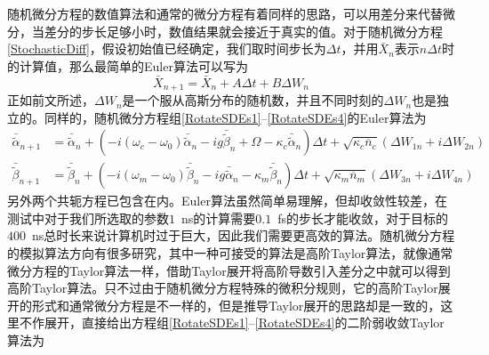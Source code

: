 随机微分方程的数值算法和通常的微分方程有着同样的思路，可以用差分来代替微分，当差分的步长足够小时，数值结果就会接近于真实的值。对于随机微分方程\eqref{StochasticDiff}，假设初始值已经确定，我们取时间步长为$\Delta t$，并用$\bar{X}_n$表示$n\Delta t$时的计算值，那么最简单的Euler算法可以写为
\begin{equation}
\bar{X}_{n+1}=\bar{X}_n + A \Delta t + B \Delta W_n
\end{equation}
正如前文所述，$\Delta W_n$是一个服从高斯分布的随机数，并且不同时刻的$\Delta W_n$也是独立的。同样的，随机微分方程组\eqref{RotateSDEs1}--\eqref{RotateSDEs4}的Euler算法为
\begin{equation}
\begin{aligned}
\bar{\tilde{\alpha}}_{n+1}&=\bar{\tilde{\alpha}}_{n}+(-i(\omega_{c}-\omega_{0})\bar{\tilde{\alpha}}_{n}-ig\bar{\tilde{\beta}}_{n}+\Omega -\kappa_{c}\bar{\tilde{\alpha}}_{n})\Delta t+\sqrt{\kappa_c\overline{n}_{c}}(\Delta{W}_{1n}+i\Delta{W}_{2n}) \\
\bar{\tilde{\beta}}_{n+1}&=\bar{\tilde{\beta}}_{n}+(-i(\omega_{m}-\omega_{0})\bar{\tilde{\beta}}_{n}-ig\bar{\tilde{\alpha}}_{n}-\kappa_{m}\bar{\tilde{\beta}}_{n})\Delta t+\sqrt{\kappa_m\overline{n}_{m}}(\Delta{W}_{3n}+i\Delta{W}_{4n})
\end{aligned}
\end{equation}
另外两个共轭方程已包含在内。Euler算法虽然简单易理解，但却收敛性较差，在测试中对于我们所选取的参数$1$~ns的计算需要$0.1$~fs的步长才能收敛，对于目标的$400$~ns总时长来说计算机时过于巨大，因此我们需要更高效的算法。随机微分方程的模拟算法方向有很多研究\cite{TOCINO2002219,Kloeden1992numerical}，其中一种可接受的算法是高阶Taylor算法，就像通常微分方程的Taylor算法一样，借助Taylor展开将高阶导数引入差分之中就可以得到高阶Taylor算法。只不过由于随机微分方程特殊的微积分规则，它的高阶Taylor展开的形式和通常微分方程是不一样的，但是推导Taylor展开的思路却是一致的，这里不作展开，直接给出方程组\eqref{RotateSDEs1}--\eqref{RotateSDEs4}的二阶弱收敛Taylor算法为

